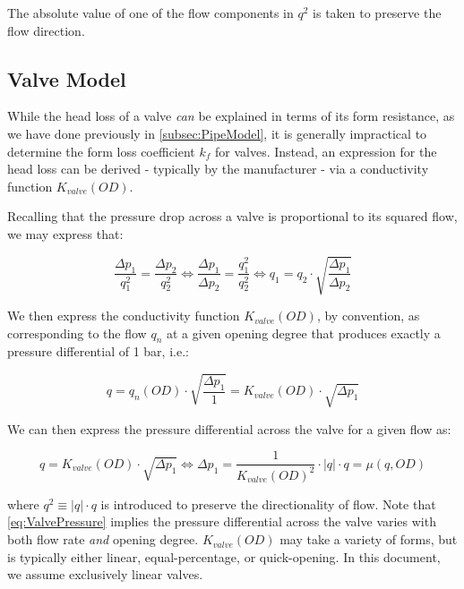 The absolute value of one of the flow components in $q^{2}$ is taken to preserve the flow direction.


\subsection{Valve Model}\label{subsec:ValveModel}

While the head loss of a valve \textit{can} be explained in terms of its form resistance, as we have done previously in \cref{subsec:PipeModel}, it is generally impractical to determine the form loss coefficient $k_f$ for valves. Instead, an expression for the head loss can be derived - typically by the manufacturer - via a conductivity function $K_{valve}(OD)$.

\smallskip

Recalling that the pressure drop across a valve is proportional to its squared flow, we may express that:

\begin{equation}\label{eq:HydrodynamicRatio}
	\frac{\Delta p_1}{q_1^2} = \frac{\Delta p_2}{q_2^2} \Leftrightarrow 
	\frac{\Delta p_1}{\Delta p_2} = \frac{q_1^2}{q_2^2}
	\Leftrightarrow
	q_1 = q_2\cdot\sqrt{\frac{\Delta p_1}{\Delta p_2}}
\end{equation}

We then express the conductivity function $K_{valve}(OD)$, by convention, as corresponding to the flow $q_n$ at a given opening degree that produces exactly a pressure differential of 1 bar, i.e.:

\begin{equation}\label{eq:Kvalve}
	q = q_n(OD)\cdot\sqrt{\frac{\Delta p_1}{1}} = K_{valve}(OD)\cdot\sqrt{\Delta p_1}
\end{equation}

We can then express the pressure differential across the valve for a given flow as:

\begin{equation}\label{eq:ValvePressure}
	 q = K_{valve}(OD)\cdot\sqrt{\Delta p_1}
	 \Leftrightarrow
	 \Delta p_1 = \frac{1}{K_{valve}(OD)^2} \cdot |q|\cdot q = \mu(q,OD)
\end{equation}

where $q^2 \equiv |q|\cdot q$ is introduced to preserve the directionality of flow. Note that \cref{eq:ValvePressure} implies the pressure differential across the valve varies with both flow rate \textit{and} opening degree. $K_{valve}(OD)$ may take a variety of forms, but is typically either linear, equal-percentage, or quick-opening. In this document, we assume exclusively linear valves.


